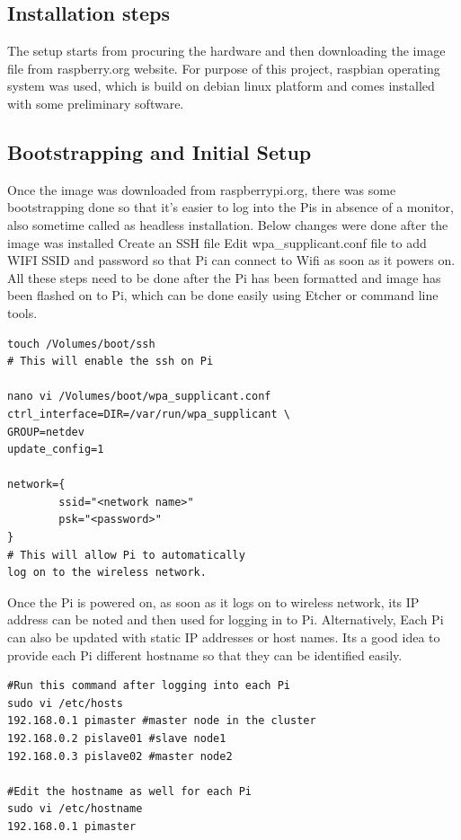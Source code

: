 \subsection{Installation steps}

The setup starts from procuring the hardware and then downloading the
image file from raspberry.org website. For purpose of this project,
raspbian operating system was used, which is build on debian linux
platform and comes installed with some preliminary software.

\subsection{Bootstrapping and Initial Setup}

Once the image was downloaded from raspberrypi.org, there was some
bootstrapping done so that it's easier to log into the Pis in absence
of a monitor, also sometime called as headless installation.  Below
changes were done after the image was installed Create an SSH file
Edit wpa\_supplicant.conf file to add WIFI SSID and password so that
Pi can connect to Wifi as soon as it powers on. All these steps need
to be done after the Pi has been formatted and image has been flashed
on to Pi, which can be done easily using Etcher or command line tools.

\begin{verbatim}
touch /Volumes/boot/ssh
# This will enable the ssh on Pi

nano vi /Volumes/boot/wpa_supplicant.conf
ctrl_interface=DIR=/var/run/wpa_supplicant \
GROUP=netdev
update_config=1

network={
        ssid="<network name>"
        psk="<password>"
}
# This will allow Pi to automatically 
log on to the wireless network.

\end{verbatim}

Once the Pi is powered on, as soon as it logs on to wireless network,
its IP address can be noted and then used for logging in to
Pi. Alternatively, Each Pi can also be updated with static IP
addresses or host names. Its a good idea to provide each Pi different
hostname so that they can be identified easily.

\begin{verbatim}
#Run this command after logging into each Pi
sudo vi /etc/hosts
192.168.0.1 pimaster #master node in the cluster
192.168.0.2 pislave01 #slave node1 
192.168.0.3 pislave02 #master node2 

#Edit the hostname as well for each Pi
sudo vi /etc/hostname
192.168.0.1	pimaster
\end{verbatim}

